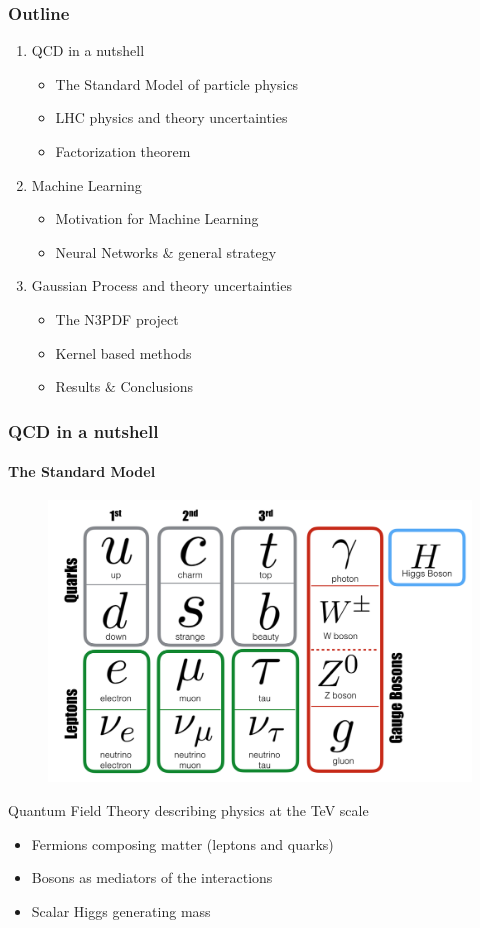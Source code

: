 \documentclass[aspectratio=43]{beamer}
\begin{document}
\begin{frame}

	\frametitle{Outline}
	
	\begin{enumerate}
		\item {\color{blue}QCD in a nutshell}
		\begin{itemize}
			\item The Standard Model of particle physics
			\item LHC physics and theory uncertainties
			\item Factorization theorem
		\end{itemize}
		\item {\color{blue}Machine Learning}
		\begin{itemize}
			\item Motivation for Machine Learning
			\item Neural Networks $\&$ general strategy
		\end{itemize}
		\item {\color{blue}Gaussian Process and theory uncertainties}
		\begin{itemize}
			\item The N3PDF project
			\item Kernel based methods
			\item Results $\&$ Conclusions
		\end{itemize}
	\end{enumerate}
	
\end{frame}

\begin{frame}

	\frametitle{QCD in a nutshell}
	\framesubtitle{The Standard Model}

	\begin{figure}
		\includegraphics[width = 6 cm]{plots/SM.png}
	\end{figure}
 
	
	Quantum Field Theory describing physics at the TeV scale
	
	\begin{itemize}
		\item Fermions composing matter (leptons and quarks)
		\item Bosons as mediators of the interactions
		\item Scalar Higgs generating mass
	\end{itemize}	
	
\end{frame}
\end{document}
